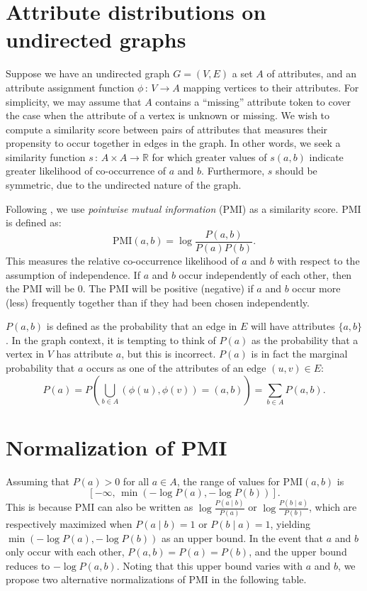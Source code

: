 \documentclass[11pt, oneside, fleqn]{article}   	%
\theoremstyle{plain}
\newcommand{\given}{\; | \;}
\newcommand{\st}{\, : \,}
\newcommand{\reals}{\mathbb{R}}
\begin{document}
\section{Attribute distributions on undirected graphs}
Suppose we have an undirected graph $G = (V, E)$ a set $A$ of attributes, and an attribute assignment function $\phi \st V \rightarrow A$ mapping vertices to their attributes.  For simplicity, we may assume that $A$ contains a ``missing'' attribute token to cover the case when the attribute of a vertex is unknown or missing.  We wish to compute a similarity score between pairs of attributes that measures their propensity to occur together in edges in the graph.  In other words, we seek a similarity function $s \st A \times A \rightarrow \reals$ for which greater values of $s(a, b)$ indicate greater likelihood of co-occurrence of $a$ and $b$.  Furthermore, $s$ should be symmetric, due to the undirected nature of the graph.

Following \cite{nameLocClustering}, we use \textit{pointwise mutual information} (PMI) as a similarity score.  PMI is defined as:
$$ \text{PMI}(a, b) = \log \frac{P(a, b)}{P(a) P(b)}. $$
This measures the relative co-occurrence likelihood of $a$ and $b$ with respect to the assumption of independence.  If $a$ and $b$ occur independently of each other, then the PMI will be 0.  The PMI will be positive (negative) if $a$ and $b$ occur more (less) frequently together than if they had been chosen independently.

$P(a, b)$ is defined as the probability that an edge in $E$ will have attributes $\{a, b\}$.  In the graph context, it is tempting to think of $P(a)$ as the probability that a vertex in $V$ has attribute $a$, but this is incorrect.  $P(a)$ is in fact the marginal probability that $a$ occurs as one of the attributes of an edge $(u, v) \in E$:
$$ P(a) = P \displaystyle \left ( \bigcup_{b \in A} (\phi(u), \phi(v)) = (a, b) \right ) = \sum_{b \in A} P(a, b). $$

\section{Normalization of PMI}
Assuming that $P(a) > 0$ for all $a \in A$, the range of values for PMI$(a, b)$ is
$$[-\infty, \, \min(-\log P(a), -\log P(b))]. $$
This is because PMI can also be written as $\log \frac{P(a \given b)}{P(a)}$ or $\log \frac{P(b \given a)}{P(b)}$, which are respectively maximized when $P(a \given b) = 1$ or $P(b \given a) = 1$, yielding $\min(-\log P(a), -\log P(b))$ as an upper bound.  In the event that $a$ and $b$ only occur with each other, $P(a, b) = P(a) = P(b)$, and the upper bound reduces to $-\log P(a, b)$.  Noting that this upper bound varies with $a$ and $b$, we propose two alternative normalizations of PMI in the following table.
\end{document}
